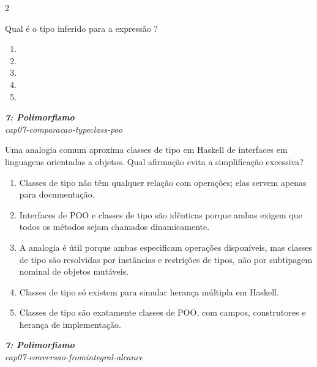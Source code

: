 \documentclass[a4paper,10pt,brazil]{article}
\begin{document}
\begin{multicols}{2}
\begin{flushright}
\end{flushright}
Qual é o tipo inferido para a expressão ?

\begin{enumerate}
  \item {}

  \item {}

  \item {}

  \item {}

  \item {}


\end{enumerate}

\begin{flushright}
  \footnotesize
  \textit{\textbf{7: Polimorfismo}}\\
  \textit{cap07-comparacao-typeclass-poo}\\

\end{flushright}
Uma analogia comum aproxima classes de tipo em Haskell de interfaces em linguagens orientadas a objetos. Qual afirmação evita a simplificação excessiva?
\begin{enumerate}
  \item Classes de tipo não têm qualquer relação com operações; elas servem apenas para documentação.
  \item Interfaces de POO e classes de tipo são idênticas porque ambas exigem que todos os métodos sejam chamados dinamicamente.
  \item A analogia é útil porque ambas especificam operações disponíveis, mas classes de tipo são resolvidas por instâncias e restrições de tipos, não por subtipagem nominal de objetos mutáveis.
  \item Classes de tipo só existem para simular herança múltipla em Haskell.
  \item Classes de tipo são exatamente classes de POO, com campos, construtores e herança de implementação.

\end{enumerate}

\begin{flushright}
  \footnotesize
  \textit{\textbf{7: Polimorfismo}}\\
  \textit{cap07-conversao-fromintegral-alcance}\\


\end{flushright}
\end{multicols}
\end{document}
